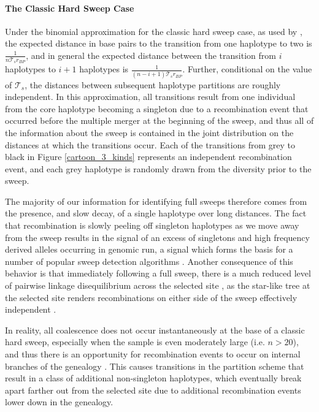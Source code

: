 \documentclass[a4paper,10pt]{article}
\begin{document}
\paragraph{The Classic Hard Sweep Case}

Under the binomial approximation for the classic hard sweep case, as used by \cite{Fay:2000usa,others}, the expected distance in base pairs to the transition from one haplotype to two is $\frac{1}{n\mathcal{T}_s r_{BP}}$, and in general the expected distance between the transition from $i$ haplotypes to $i+1$ haplotypes is $\frac{1}{\left(n-i+1\right)\mathcal{T}_s r_{BP}}$. Further, conditional on the value of $\mathcal{T}_s$, the distances between subsequent haplotype partitions are roughly independent. In this approximation, all transitions result from one individual from the core haplotype becoming a singleton due to a recombination event that occurred before the multiple merger at the beginning of the sweep, and thus all of the information about the sweep is contained in the joint distribution on the distances at which the transitions occur. Each of the transitions from grey to black in Figure \ref{cartoon_3_kinds} represents an independent recombination event, and each grey haplotype is randomly drawn from the diversity prior to the sweep.

The majority of our information for identifying full sweeps therefore comes from the presence, and slow decay, of a single haplotype over long distances. The fact that recombination is slowly peeling off singleton haplotypes as we move away from the sweep results in the signal of an excess of singletons and high frequency derived alleles \citep{Fay:2000usa} occurring in genomic run, a signal which forms the basis for a number of popular sweep detection algorithms \cite{Sweepfinder,EHH,etc}. Another consequence of this behavior is that immediately following a full sweep, there is a much reduced level of pairwise linkage disequilibrium across the selected site \citep{Stephan2006,McVean:2006ke}, as the star-like tree at the selected site renders recombinations on either side of the sweep effectively independent \citep{McVean:2006ke}.

In reality, all coalescence does not occur instantaneously at the base of a classic hard sweep, especially when the sample is even moderately large (i.e. $n > 20$), and thus there is an opportunity for recombination events to occur on internal branches of the genealogy \cite{Etheridge06,Barton98}. This causes transitions in the partition scheme that result in a class of additional non-singleton haplotypes, which eventually break apart farther out from the selected site due to additional recombination events lower down in the genealogy.
\end{document}
